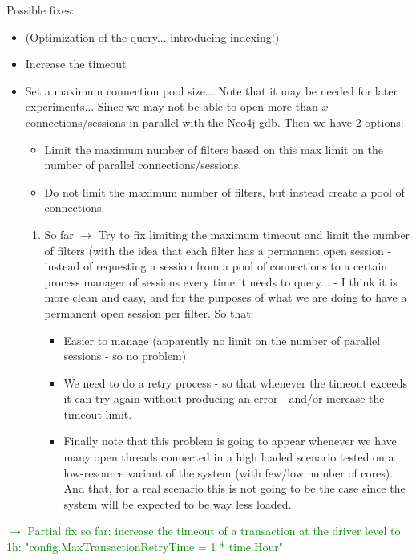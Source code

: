 \documentclass[12pt,a4paper]{article}
\begin{document}
Possible fixes:
\begin{itemize}
    \item (Optimization of the query... introducing indexing!)
    \item Increase the timeout
    \item Set a maximum connection pool size... Note that it may be needed for later experiments...
    Since we may not be able to open more than $x$ connections/sessions in parallel with the Neo4j gdb. Then we have 2 options:
    \begin{itemize}
        \item Limit the maximum number of filters based on this max limit on the number of parallel connections/sessions.
        \item Do not limit the maximum number of filters, but instead create a pool of connections.
    \end{itemize}
    \begin{enumerate}
        \item So far $\rightarrow$ Try to fix limiting the maximum timeout and limit the number of filters (with the idea that each filter has a permanent open session - instead of requesting a session from a pool of connections to a certain process manager of sessions every time it needs to query... - I think it is more clean and easy, and for the purposes of what we are doing to have a permanent open session per filter. So that:
        \begin{itemize}
            \item Easier to manage (apparently no limit on the number of parallel sessions - so no problem)
            \item We need to do a retry process - so that whenever the timeout exceeds it can try again without producing an error - and/or increase the timeout limit.
            \item Finally note that this problem is going to appear whenever we have many open threads connected in a high loaded scenario tested on a low-resource variant of the system (with few/low number of cores). And that, for a real scenario this is not going to be the case since the system will be expected to be way less loaded.
        \end{itemize}
    \end{enumerate}
\end{itemize}

\textcolor{green}{$\rightarrow$ Partial fix so far: increase the timeout of a transaction at the driver level to 1h: "config.MaxTransactionRetryTime = 1 * time.Hour"\\}
\end{document}

